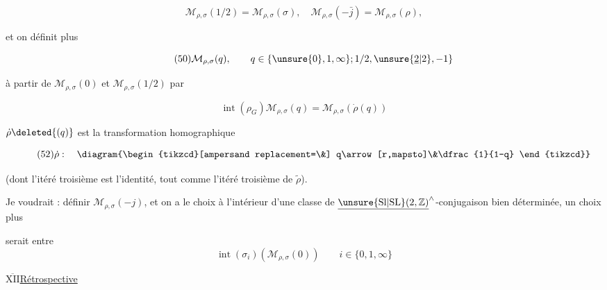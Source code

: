 \begin{equation*}
\tag{49}
\mathcal M_{\rho,\sigma}(1/2)=\mathcal M_{\rho,\sigma}(\sigma),\quad
\mathcal M_{\rho,\sigma}(-\bar j)=\mathcal M_{\rho,\sigma}(\rho),
\end{equation*}

et on définit plus 

\begin{equation*}
\tag{50}
\mathcal M_{\rho,\sigma}(q),\qquad
q\in\{\unsure{0},1,\infty\};1/2,\unsure{\underline 2|2},-1\}
\end{equation*}

à partir de $\mathcal M_{\rho,\sigma}(0)$ et
$\mathcal M_{\rho,\sigma}(1/2)$ par

\begin{equation*}
\tag{51}
\operatorname{int}(\rho_G)\mathcal M_{\rho,\sigma}(q)
=\mathcal M_{\rho,\sigma}(\dot\rho(q))
\end{equation*}


$\dot\rho\deleted{(q)}$ est la transformation homographique

\begin{equation*}
\tag{52}
\dot\rho:\quad
\diagram{\begin{tikzcd}[ampersand replacement=\&]
q\arrow[r,mapsto]\&\dfrac{1}{1-q}
\end{tikzcd}}
\end{equation*}

(dont l'itéré troisième est l'identité, tout comme l'itéré troisième
de $\widetilde\rho$).

Je voudrait : définir $\mathcal M_{\rho,\sigma}(-j)$, et
 on a le choix à l'intérieur d'une classe de
$\underline{\unsure{\mathrm{Sl}|\mathrm{SL}}(2,\mathbb Z)}^{\wedge}$-conjugaison bien déterminée,
un choix plus


 serait entre
\[
\operatorname{int}(\sigma_i)(\mathcal M_{\rho,\sigma}(0))
\qquad i\in\{0,1,\infty\}
\tag{53}
\]

\uline{$\overline{\mathrm{XII}}$}\qquad\uline{Rétrospective}


